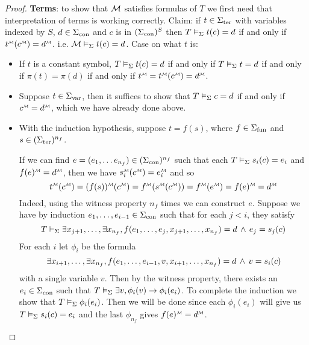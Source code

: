 \begin{proof}
    \textbf{Terms}: to show that $\mathcal{M}$ satisfies formulas of $T$ 
    we first need that interpretation of terms is working correctly. 
    Claim: if $t \in {\Sigma}_\mathrm{ter}$ with variables indexed by $S$,
    $d \in {\Sigma}_\mathrm{con}$ and
    $c$ is in $({\Sigma}_\mathrm{con})^S$
    then $T \vDash_{\Sigma} t(c) = d$ 
    if and only if $\mmintp{t}(\mmintp{c}) = \mmintp{d}$.
    i.e. $\mathcal{M} \vDash_{\Sigma} t(c) = d$.
    Case on what $t$ is:
    \begin{itemize}
        \item If $t$ is a constant symbol,
        $T \vDash_{\Sigma} t(c) = d$ if and only if 
        $T \vDash_{\Sigma} t = d$ 
        if and only if $\pi(t) = \pi(d)$
        if and only if $\mmintp{t} = \mmintp{t}(\mmintp{c}) = \mmintp{d}$.
        \item Suppose $t \in {\Sigma}_\mathrm{var}$,
        then it suffices to show that $T \vDash_{\Sigma} c = d$ 
        if and only if $\mmintp{c} = \mmintp{d}$, 
        which we have already done above.
        \item With the induction hypothesis, 
        suppose $t = f(s)$, 
        where $f \in {\Sigma}_\mathrm{fun}$ and $s \in ({\Sigma}_\mathrm{ter})^{n_f}$.
        \begin{forward} 
            If we can find 
            $e = (e_1, \dots e_{n_f}) \in ({\Sigma}_\mathrm{con})^{n_f}$ 
            such that each 
            $T \vDash_{\Sigma} s_i (c) = e_i$
            and $\mmintp{f(e)} = \mmintp{d}$,
            then we have 
            $\mmintp{s_i}(\mmintp{c})
            = \mmintp{e_i}$ and so
            \[
                \mmintp{t}(\mmintp{c}) = \mmintp{(f(s))}(\mmintp{c})
                = \mmintp{f}(\mmintp{s}(\mmintp{c}))
                = \mmintp{f}(\mmintp{e})
                = \mmintp{f(e)} = \mmintp{d}
            \]
            Indeed, using the witness property $n_f$
            times we can construct $e$.
            Suppose we have by induction
            $e_1,\dots, e_{i-1} \in {\Sigma}_\mathrm{con}$
            such that for each $j<i$, 
            they satisfy
            \[
                T \vDash_{\Sigma} \exists x_{j+1}, \dots, \exists x_{n_f}, 
                f(e_1, \dots, e_j, x_{j+1},\dots, x_{n_f}) = d 
                \, \land \, e_j = s_j (c)
            \]
            For each $i$ let $\phi_i$ be the formula
            \[
                \exists x_{i+1}, \dots, \exists x_{n_f}, 
                f(e_1, \dots, e_{i-1},v,x_{i+1},\dots, x_{n_f}) = d 
                \, \land \, v = s_i (c)
            \]
            with a single variable $v$.
            Then by the witness property,
            there exists an $e_i \in {\Sigma}_\mathrm{con}$ such that
            $T \vDash_{\Sigma} \exists v, \phi_i(v) \to \phi_i(e_i)$.
            To complete the induction we show that $T \vDash_{\Sigma} \phi_i(e_i)$.
            Then we will be done since each $\phi_i(e_i)$ 
            will give us $T \vDash_{\Sigma} s_i (c) = e_i$
            and the last $\phi_{n_f}$ gives $\mmintp{f(e)} = \mmintp{d}$.


\end{forward}
\end{itemize}
\end{proof}

